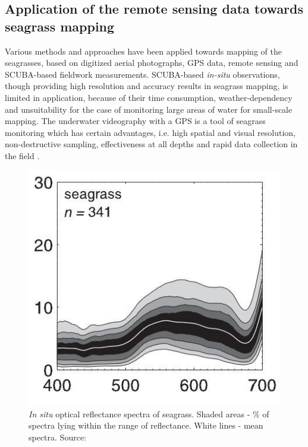 \documentclass[11pt]{article}
\begin{document}
\subsection[Application of the remote sensing...]{Application of the remote sensing data towards seagrass mapping}
Various methods and approaches have been applied towards mapping of the seagrasses, based on
digitized aerial photographs, \ac{GPS} data, remote sensing and \ac{SCUBA}-based fieldwork measurements.
\ac{SCUBA}-based \textit{in-situ} observations, though providing high resolution and accuracy results in seagrass
mapping, is limited in application, because of their time consumption, weather-dependency and
unsuitability for the case of monitoring large areas of water for small-scale mapping. 
The underwater videography with a \ac{GPS} is a tool of seagrass monitoring which has certain advantages, i.e.
high spatial and visual resolution, non-destructive sampling, effectiveness at all depths and rapid data
collection in the field \cite{Schultz08}\label{Schultz08}. 

\begin{figure}
	\centering
	\includegraphics[scale=0.30]{Fig-11.jpg}
	\caption{\textit{In situ} optical reflectance spectra of seagrass. Shaded areas - \% of spectra lying within the range of reflectance. 
		White lines - mean spectra. Source: \cite{Hochberg03b}\label{Hochberg03b}}
	\label{fig:13}
\end{figure}
\end{document}
